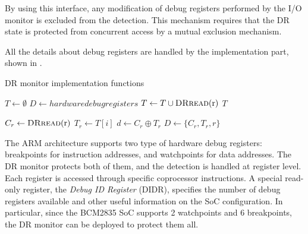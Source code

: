 By using this interface, any modification of debug registers performed by the I/O monitor is excluded from the detection.
This mechanism requires that the DR state is protected from concurrent access by a mutual exclusion mechanism.

All the details about debug registers are handled by the implementation part, shown in .
\begin{algorithm}[h]
\caption{DR monitor implementation functions}
\label{alg:dr-impl}
\begin{algorithmic}[1]
 
	\State $T \gets \emptyset$
	\State $D \gets hardware debug registers$
		\State $T \gets T \cup \Call{DRread}{$r$}$ 
	\EndFor
	\State \Return $T$
\EndFunction
\Statex
\end{algorithmic}

\begin{algorithmic}[1]
 
		\State $C_r \gets \Call{DRread}{$r$}$ 
		\State $T_r \gets T[i]$ 
		\State $d \gets C_r \oplus T_r$ 
			\State $D \gets \{C_r, T_r, r\}$ 
			\State {} 
		\EndIf
	\EndFor
\EndFunction
\Statex
\end{algorithmic}

\begin{algorithmic}[1]
	\State {} 
\EndFunction
\end{algorithmic}
\end{algorithm}
The ARM architecture supports two type of hardware debug registers: breakpoints for instruction addresses, and watchpoints for data addresses.
The DR monitor protects both of them, and the detection is handled at register level. Each register is accessed through specific coprocessor instructions.
A special read-only register, the \emph{Debug ID Register} (DIDR), specifies the number of debug registers available and other useful information on the SoC configuration.
In particular, since the BCM2835 SoC supports 2 watchpoints and 6 breakpoints, the DR monitor can be deployed to protect them all.


